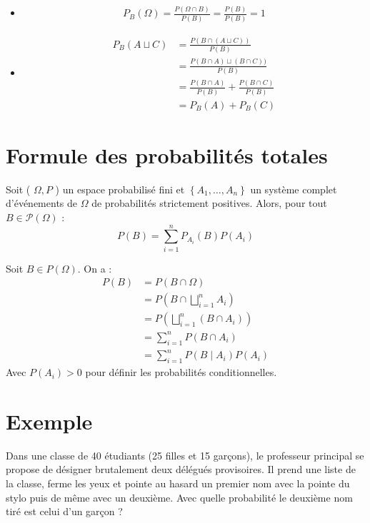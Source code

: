 \documentclass[../main.tex]{subfiles}
\begin{document}
\begin{itemize}
    \item \begin{align*}
        P_B(\Omega) = \frac{P(\Omega \cap B)}{P(B)} = \frac{P(B)}{P(B)} = 1
    \end{align*}
    \item \begin{align*}
        P_B(A\sqcup C) &= \frac{P(B \cap (A \sqcup C))}{P(B)} \\
        &= \frac{P(B\cap A)\sqcup (B\cap C))}{P(B)} \\
        &= \frac{P(B\cap A)}{P(B)} + \frac{P(B\cap C)}{P(B)} \\
        &= P_B(A) + P_B(C)
    \end{align*}
\end{itemize}

\section{Formule des probabilités totales}
\begin{tcolorbox}[title=Théorème 32.31, title filled=false, colframe=orange, colback=orange!10!white]
    Soit ( $\Omega, P$ ) un espace probabilisé fini et $\left\{A_1, \ldots, A_n\right\}$ un système complet d'événements de $\Omega$ de probabilités strictement positives. Alors, pour tout $B \in \mathcal{P}(\Omega)$ :
    $$P(B)=\sum_{i=1}^n P_{A_i}(B) P\left(A_i\right)$$
\end{tcolorbox}

\noindent Soit $B\in P(\Omega)$. On a : 
\begin{align*}
    P(B) &= P(B\cap \Omega) \\
    &= P(B\cap \bigsqcup_{i=1}^{n} A_i) \\
    &= P(\bigsqcup_{i=1}^{n} (B\cap A_i)) \\
    &= \sum_{i=1}^{n} P(B\cap A_i) \\
    &= \sum_{i=1}^{n} P(B \mid A_i)P(A_i)
\end{align*}
Avec $P(A_i) > 0$ pour définir les probabilités conditionnelles. 

\section{Exemple}
\begin{tcolorbox}[title=Exemple 32.32, title filled=false, colframe=darkgreen, colback=darkgreen!10!white]
    Dans une classe de 40 étudiants (25 filles et 15 garçons), le professeur principal se propose de désigner brutalement deux délégués provisoires. Il prend une liste de la classe, ferme les yeux et pointe au hasard un premier nom avec la pointe du stylo puis de même avec un deuxième. Avec quelle probabilité le deuxième nom tiré est celui d'un garçon ?
\end{tcolorbox}
\end{document}
